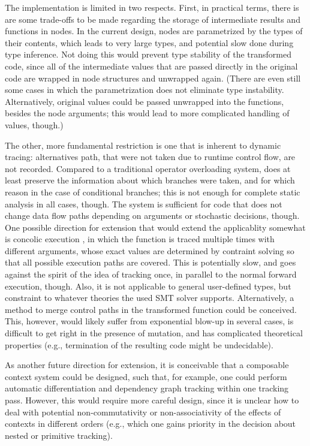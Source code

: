 The implementation is limited in two respects.  First, in practical terms, there is are some
trade-offs to be made regarding the storage of intermediate results and functions in nodes.  In the
current design, nodes are parametrized by the types of their contents, which leads to very large
types, and potential slow done during type inference.  Not doing this would prevent type stability
of the transformed code, since all of the intermediate values that are passed directly in the
original code are wrapped in node structures and unwrapped again.  (There are even still some cases
in which the parametrization does not eliminate type instability.  Alternatively, original values
could be passed unwrapped into the  functions, besides the node arguments; this
would lead to more complicated handling of values, though.)

The other, more fundamental restriction is one that is inherent to dynamic tracing: alternatives
path, that were not taken due to runtime control flow, are not recorded.  Compared to a traditional
operator overloading system, \irtrackerjl{} does at least preserve the information about which
branches were taken, and for which reason in the case of conditional branches; this is not enough
for complete static analysis in all cases, though.  The system is sufficient for code that does not
change data flow paths depending on arguments or stochastic decisions, though.  One possible
direction for extension that would extend the applicablity somewhat is concolic execution
\parencite{zeller2019concolic}, in which the function is traced multiple times with different
arguments, whose exact values are determined by contraint solving so that all possible execution
paths are covered.  This is potentially slow, and goes against the spirit of the idea of tracking
once, in parallel to the normal forward execution, though.  Also, it is not applicable to general
user-defined types, but constraint to whatever theories the used SMT solver supports.
Alternatively, a method to merge control paths in the transformed function could be conceived.
This, however, would likely suffer from exponential blow-up in several cases, is difficult to get
right in the presence of mutation, and has complicated theoretical properties (e.g., termination of
the resulting code might be undecidable).

As another future direction for extension, it is conceivable that a composable context system could
be designed, such that, for example, one could perform automatic differentiation and dependency
graph tracking within one tracking pass.  However, this would require more careful design, since it
is unclear how to deal with potential non-commutativity or non-associativity of the effects of
contexts in different orders (e.g., which one gains priority in the decision about nested or
primitive tracking).



